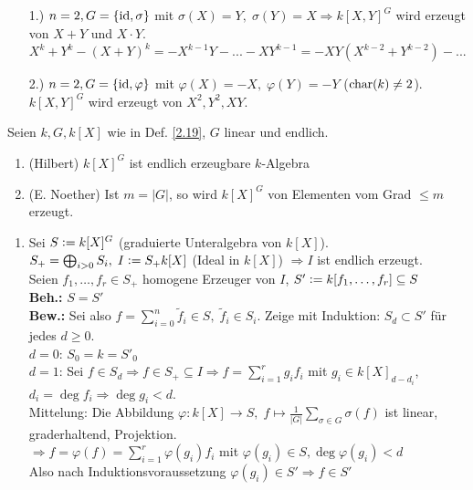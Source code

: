\documentclass[a4paper, 10pt]{report}
\begin{document}
\begin{nnBsp}
  \begin{enumerate}
    \item[1.)] $n=2, G = \{\mathrm{id}, \sigma\}$ mit $\sigma(X) = Y, \; \sigma(Y) = X
               \Rightarrow k[X,Y]^G$ wird erzeugt von $X+Y$ und $X \cdot Y$.\\
               $X^k+Y^k - (X + Y)^k = -X^{k-1} Y - ... - X Y^{k-1} = -X Y
               (X^{k-2} + Y^{k-2}) - ...$
    \item[2.)] $n=2, G = \{\mathrm{id}, \varphi\}$ mit $\varphi(X) = -X, \; \varphi(Y) =
               -Y$ ($\mathrm{char}(k) \not= 2$).\\
               $k[X,Y]^G$ wird erzeugt von $X^2, Y^2, XY$.
  \end{enumerate}
\end{nnBsp}

\begin{Satz}
  Seien $k, G, k[X]$ wie in Def. \ref{2.19}, $G$ linear und endlich.
  \begin{enumerate}
    \item (Hilbert) $k[X]^G$ ist endlich erzeugbare $k$-Algebra
    \item (E. Noether) Ist $m = |G|$, so wird $k[X]^G$ von Elementen vom Grad
          $\le m$ erzeugt.
  \end{enumerate}
\end{Satz}

\begin{Bew}
  \begin{enumerate}
    \item 
      Sei $S \mathrel{\mathop:}= k[X]^G$ (graduierte Unteralgebra von $k[X]$).\\
      $S_+ = \bigoplus_{i > 0} S_i, \; I \mathrel{\mathop:}= S_+ k[X]$ (Ideal in $k[X]$) 
      $\Rightarrow I$ ist endlich erzeugt.\\
      Seien $f_1, \dots, f_r \in S_+$ homogene Erzeuger von $I$, $S' \mathrel{\mathop:}= k[f_1,
      \dots, f_r] \subseteq S$\\
      \textbf{Beh.:} $S=S'$\\
      \textbf{Bew.:} Sei also $f = \sum_{i=0}^n \tilde{f}_i \in S, \; \tilde{f}_i
      \in S_i$. Zeige mit Induktion: $S_d \subset S'$ für jedes $d \ge 0$.\\
      $d = 0$: $S_0 = k = S'_0$\\
      $d = 1$: Sei $f \in S_d \Rightarrow f \in S_+ \subseteq I \Rightarrow f =
      \sum_{i=1}^r g_i f_i$ mit $g_i \in k[X]_{d- d_i}$, $d_i = \deg{f_i}
      \Rightarrow \deg{g_i} < d$.\\
      \glqq Mittelung\grqq: Die Abbildung $\varphi: k[X] \to S, \; f \mapsto
      \frac{1}{|G|} \sum_{\sigma \in G} \sigma(f)$ ist linear, graderhaltend,
      Projektion.\\
      $\Rightarrow f = \varphi(f) = \sum_{i=1}^r \varphi(g_i) f_i$ mit
      $\varphi(g_i) \in S,\deg{\varphi(g_i)}<d$\\
      Also nach Induktionsvoraussetzung $\varphi(g_i) \in S' \Rightarrow f \in
      S'$
  \end{enumerate}
\end{Bew}
\end{document}
